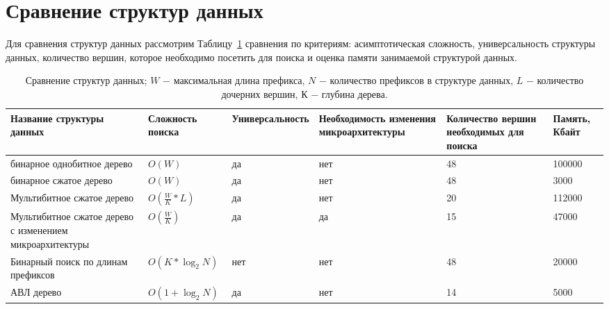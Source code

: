 \documentclass[a4paper, 12pt, titlepage, finall]{extreport}
\begin{document}
    \section{Сравнение структур данных}
        Для сравнения структур данных рассмотрим Таблицу~\ref{tab:tab1} сравнения по критериям: асимптотическая сложность, универсальность структуры данных,
        количество вершин, которое необходимо посетить для поиска и оценка памяти занимаемой структурой данных. 
        
        \begin{table}[ht]
            \footnotesize
            \caption{Сравнение структур данных; $W$ $-$ максимальная длина префикса, $N$ $-$ количество префиксов в структуре данных,
            $L$ $-$ количество дочерних вершин, $К$ $-$ глубина дерева.}\label{tab:tab1}
            \begin{tabular}{|m{2.5cm}|m{2.2cm}|m{2.7cm}|m{3cm}|m{2.0cm}|m{1.9cm}|}
                \hline
                \bf Название структуры данных     & \bf Сложность поиска & \bf Универсальность & \bf Необходимость изменения микроархитектуры & \bf Количество вершин необходимых для поиска & \bf Память, Кбайт \\
                \hline
                бинарное однобитное дерево & $O(W)$ & да & нет & 48 & 100000 \\
                \hline
                бинарное сжатое дерево & $O(W)$ & да & нет & 48 & 3000 \\
                \hline
                Мультибитное сжатое дерево & $O(\frac{W}{K}*L)$ & да & нет & 20 & 112000 \\
                \hline
                Мультибитное сжатое дерево с изменением микроархитектуры & $O(\frac{W}{K})$ & да & да & 15 & 47000 \\
                \hline
                Бинарный поиск по длинам префиксов & $O(K*\log_2{N})$ & нет & нет & 48 & 20000 \\
                \hline
                АВЛ дерево & $O(1 + \log_2{N})$ & да & нет& 14 & 5000 \\
                \hline
            \end{tabular}
        \end{table}
        
\end{document}
